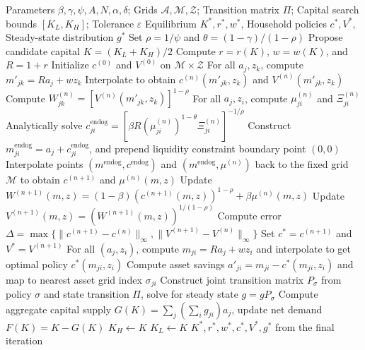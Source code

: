 \documentclass[a4paper,12pt]{article}
\newcommand{\R}{R}
\newcommand{\Agrid}{\mathcal{A}}
\newcommand{\Mgrid}{\mathcal{M}}
\newcommand{\Zgrid}{\mathcal{Z}}
\newcommand{\tol}{\varepsilon}
\begin{document}
\begin{algorithm}[h!]
\caption{EGM for Epstein-Zin Aiyagari Equilibrium}
\label{alg:ez-aiyagari-egm}
\begin{algorithmic}[1]
\Require Parameters $\beta,\gamma,\psi,A,N,\alpha,\delta$; Grids $\Agrid,\Mgrid,\Zgrid$; Transition matrix $\Pi$; Capital search bounds $[K_L,K_H]$; Tolerance $\tol$
\Ensure Equilibrium $K^\ast,r^\ast,w^\ast$, Household policies $c^\ast,V^\ast$, Steady-state distribution $g^\ast$
\State Set $\rho=1/\psi$ and $\theta=(1-\gamma)/(1-\rho)$
\While{$K_H-K_L>\tol$}
    \State Propose candidate capital $K=(K_L+K_H)/2$
    \State Compute $r=r(K)$, $w=w(K)$, and $\R=1+r$
    \State Initialize $c^{(0)}$ and $V^{(0)}$ on $\Mgrid\times\Zgrid$
    \Repeat
        \State For all $a_j,z_k$, compute $m'_{jk}=\R a_j+wz_k$
        \State Interpolate to obtain $c^{(n)}(m'_{jk},z_k)$ and $V^{(n)}(m'_{jk},z_k)$
        \State Compute $W^{(n)}_{jk}=[V^{(n)}(m'_{jk},z_k)]^{1-\rho}$
        \State For all $a_j,z_i$, compute $\mu^{(n)}_{ji}$ and $\Xi^{(n)}_{ji}$
        \State Analytically solve $c^{\mathrm{endog}}_{ji}=[\beta\R(\mu^{(n)}_{ji})^{1-\theta}\Xi^{(n)}_{ji}]^{-1/\rho}$
        \State Construct $m^{\mathrm{endog}}_{ji}=a_j+c^{\mathrm{endog}}_{ji}$, and prepend liquidity constraint boundary point $(0,0)$
        \State Interpolate points $(m^{\mathrm{endog}}, c^{\mathrm{endog}})$ and $(m^{\mathrm{endog}}, \mu^{(n)})$ back to the fixed grid $\Mgrid$ to obtain $c^{(n+1)}$ and $\mu^{(n)}(m,z)$
        \State Update $W^{(n+1)}(m,z)=(1-\beta)(c^{(n+1)}(m,z))^{1-\rho}+\beta\mu^{(n)}(m,z)$
        \State Update $V^{(n+1)}(m,z)=(W^{(n+1)}(m,z))^{1/(1-\rho)}$
        \State Compute error $\Delta=\max\{\|c^{(n+1)}-c^{(n)}\|_\infty,\|V^{(n+1)}-V^{(n)}\|_\infty\}$
    \Until{$\Delta<\tol$}
    \State Set $c^\ast=c^{(n+1)}$ and $V^\ast=V^{(n+1)}$
    \State For all $(a_j,z_i)$, compute $m_{ji}=\R a_j+wz_i$ and interpolate to get optimal policy $c^\ast(m_{ji},z_i)$
    \State Compute asset savings $a'_{ji}=m_{ji}-c^\ast(m_{ji},z_i)$ and map to nearest asset grid index $\sigma_{ji}$
    \State Construct joint transition matrix $P_\sigma$ from policy $\sigma$ and state transition $\Pi$, solve for steady state $g=gP_\sigma$
    \State Compute aggregate capital supply $G(K)=\sum_j(\sum_i g_{ji})a_j$, update net demand $F(K)=K-G(K)$
        \State $K_H\gets K$ 
    \Else
        \State $K_L\gets K$ 
    \EndIf
\EndWhile
\State \Return $K^\ast,r^\ast,w^\ast,c^\ast,V^\ast,g^\ast$ from the final iteration
\end{algorithmic}
\end{algorithm}
\end{document}
